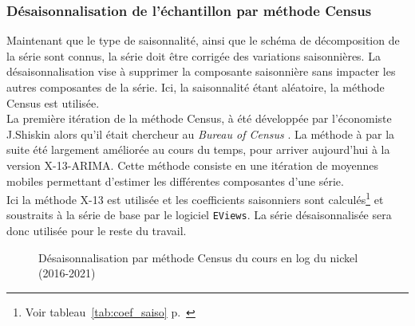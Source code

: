 \subsubsection{Désaisonnalisation de l'échantillon par méthode Census}
Maintenant que le type de saisonnalité, ainsi que le schéma de décomposition de la série sont connus, la série doit être corrigée des variations saisonnières. La 
désaisonnalisation vise à supprimer la composante saisonnière sans impacter les autres composantes de la série. Ici, la saisonnalité étant aléatoire, la méthode Census
est utilisée.\\[11pt]
La première itération de la méthode Census, à été développée par l'économiste J.Shiskin alors qu'il était chercheur au \textit{Bureau of Census} . La méthode à par la 
suite été largement améliorée au cours du temps, pour arriver aujourd'hui à la version X-13-ARIMA. Cette méthode consiste en une itération de moyennes mobiles permettant 
d'estimer les différentes composantes d'une série.\\[11pt]
Ici la méthode X-13 est utilisée et les coefficients saisonniers sont calculés\footnote{Voir tableau~\ref{tab:coef_saiso} p.~\pageref{tab:coef_saiso}} et soustraits à la série de base par le logiciel \texttt{EViews}. La série désaisonnalisée sera donc utilisée pour le reste du travail.
\vfill
\begin{figure}[H]
    \centering
    
    \caption{Désaisonnalisation par méthode Census du cours en log du nickel (2016-2021)}
\end{figure}
\vfill